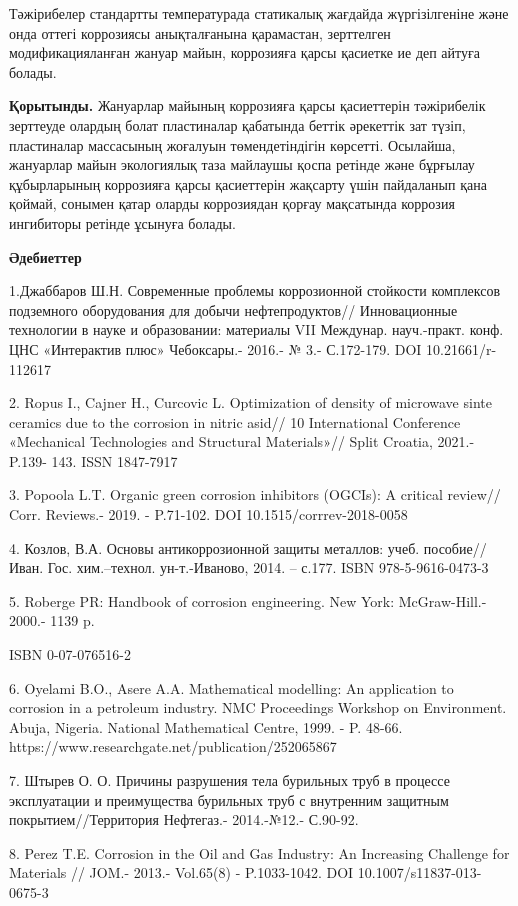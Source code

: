 Тәжірибелер стандартты температурада статикалық жағдайда жүргізілгеніне
және онда оттегі коррозиясы анықталғанына қарамастан, зерттелген
модификацияланған жануар майын, коррозияға қарсы қасиетке ие деп айтуға
болады.

{\bfseries Қорытынды.} Жануарлар майының коррозияға қарсы қасиеттерін
тәжірибелік зерттеуде олардың болат пластиналар қабатында беттік
әрекеттік зат түзіп, пластиналар массасының жоғалуын төмендетіндігін
көрсетті. Осылайша, жануарлар майын экологиялық таза майлаушы қоспа
ретінде және бұрғылау құбырларының коррозияға қарсы қасиеттерін жақсарту
үшін пайдаланып қана қоймай, сонымен қатар оларды коррозиядан қорғау
мақсатында коррозия ингибиторы ретінде ұсынуға болады.

{\bfseries Әдебиеттер}

1.Джаббаров Ш.Н. Современные проблемы коррозионной стойкости комплексов
подземного оборудования для добычи нефтепродуктов// Инновационные
технологии в науке и образовании: материалы VII Междунар. науч.-практ.
конф. ЦНС «Интерактив плюс» Чебоксары.- 2016.- № 3.- С.172-179. DOI
10.21661/r-112617

2. Ropus I., Cajner H., Curcovic L. Optimization of density of microwave
sinte ceramics due to the corrosion in nitric asid// 10 International
Conference «Mechanical Technologies and Structural Materials»// Split
Croatia, 2021.- P.139- 143. ISSN 1847-7917

3. Popoola L.T. Organic green corrosion inhibitors (OGCIs): A critical
review// Corr. Reviews.- 2019. - P.71-102. DOI 10.1515/corrrev-2018-0058

4. Козлов, В.А. Основы антикоррозионной защиты металлов: учеб.
пособие//Иван. Гос. хим.--технол. ун-т.-Иваново, 2014. -- с.177. ISBN
978-5-9616-0473-3

5. Roberge PR: Handbook of corrosion engineering. New York:
McGraw-Hill.- 2000.- 1139 p.

ISBN 0-07-076516-2

6. Oyelami B.O., Asere A.A. Mathematical modelling: An application to
corrosion in a petroleum industry. NMC Proceedings Workshop on
Environment. Abuja, Nigeria. National Mathematical Centre, 1999. - P.
48-66. https://www.researchgate.net/publication/252065867

7. Штырев О. О. Причины разрушения тела бурильных труб в процессе
эксплуатации и преимущества бурильных труб с внутренним защитным
покрытием//Территория Нефтегаз.- 2014.-№12.- С.90-92.

8. Perez T.E. Corrosion in the Oil and Gas Industry: An Increasing
Challenge for Materials // JOM.- 2013.- Vol.65(8) - P.1033-1042. DOI
10.1007/s11837-013-0675-3

